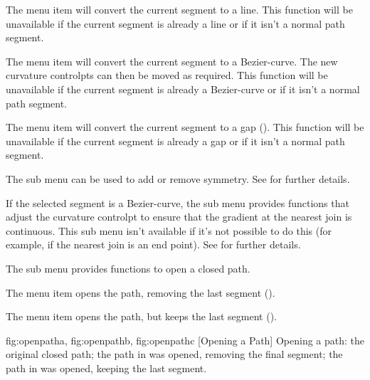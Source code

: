 
The  menu item will convert the
current segment to a line. This function will be unavailable if the
current segment is already a line or if it isn't a normal path segment.


The  menu item will convert the
current segment to a \gls{Bezier-curve}. The new curvature 
\glspl{controlpt} can then be moved as required.
This function will be unavailable if the
current segment is already a \gls{Bezier-curve} or if it isn't a normal path segment.


The  menu item will convert the
current segment to a \gls{gap} (). This function will be
unavailable if the current segment is already a \gls{gap} or if it
isn't a normal path segment.


The  sub menu can be used to add or remove
\gls{symmetry}.
See  for further details.


If the selected segment is a \gls{Bezier-curve}, the
 sub menu provides functions that adjust
the curvature \gls*{controlpt} to ensure that the gradient at the
nearest join is continuous. This sub menu isn't available if it's not
possible to do this (for example, if the nearest join is an end
point). See  for further details.


The  sub menu provides functions to open a
closed path.


The  menu item
opens the path, removing the last segment ().


The  menu item
opens the path, but keeps the last segment ().

{
 {fig:openpatha}{}{},
 {fig:openpathb}{}{},
 {fig:openpathc}{}{}
}
  [Opening a Path]
  {Opening a path:  the original closed path;
    the path in  was opened,
   removing the final segment;  the path in 
    was opened, keeping the last segment.}

